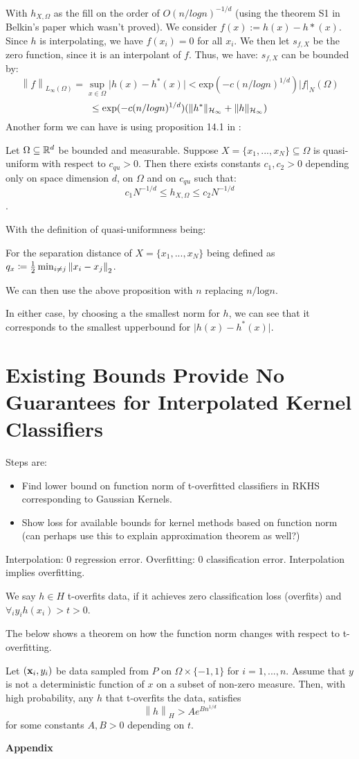\documentclass[english]{article}
\newcommand\norm[1]{\left\lVert#1\right\rVert}
\begin{document}
With $h_{X,\Omega}$ as the fill on the order of $O(n/logn)^{-1/d}$ (using the theorem S1 in Belkin's paper which wasn't proved).
We consider $f(x) := h(x) - h*(x)$. Since $h$ is interpolating, we have $f(x_i) = 0$ for all $x_i$. We then let $s_{f,X}$ be the zero function, since it is an interpolant of $f$. Thus, we have:
$s_{f,X}$ can be bounded by:
\[
\norm{f}_{L_\infty(\Omega)} = \sup_{x \in \Omega} \vert h(x) - h^*(x)\vert <
\text{exp}(-c(n/log n)^{1/d})|f|_N(\Omega)
\]
\[
\leq \text{exp}(-c(n/log n)^{1/d}) (\| h^* \|_{\mathcal{H}_\infty} + \| h \|_{\mathcal{H}_\infty})
\]
Another form we can have is using proposition 14.1 in \cite{ScatteredDataApproximation}:
\begin{prop}
	Let $\Omega \subseteq \mathbb{R}^d$ be bounded and measurable. Suppose $X = \{x_1, ... , x_N\} \subseteq \Omega$ is quasi-uniform with respect to  $c_{qu} > 0$. Then there exists constants $c_1, c_2 > 0$ depending only on space dimension $d$, on $\Omega$ and on $c_{qu}$ such that:
	\[c_1N^{-1/d} \leq h_{X,\Omega} \leq c_2N^{-1/d} \].
\end{prop}
With the definition of quasi-uniformness being:
\begin{defn}
	For the separation distance of $X = \{x_1, ... , x_N\}$ being defined as $q_x \coloneqq \half \min_{i\neq j} \norm{x_i - x_j}_2$.
\end{defn}
We can then use the above proposition with $n$ replacing $n/\text{log}n$.

In either case, by choosing a the smallest norm for $h$, we can see that it corresponds to the smallest upperbound for $\vert h(x) - h^*(x)\vert$.

\section{Existing Bounds Provide No Guarantees for Interpolated Kernel Classifiers} \label{sec:BoundsKernel}
Steps are: 
\begin{itemize}
	\item Find lower bound on function norm of t-overfitted classifiers in RKHS corresponding to Gaussian Kernels.
	\item Show loss for available bounds for kernel methods based on function norm (can perhaps use this to explain approximation theorem as well?)
\end{itemize}
Interpolation: 0 regression error. Overfitting: 0 classification error. Interpolation implies overfitting.
\begin{defn}
	We say $h \in H$ t-overfits data, if it achieves zero classification loss (overfits) and $\forall_iy_ih(x_i) > t > 0$.
\end{defn}
The below shows a theorem on how the function norm changes with respect to t-overfitting.
\begin{thm}
	Let $(\mathbf{x}_i ,y_i)$ be data sampled from $P$ on $\Omega \times \{-1, 1\}$ for $i = 1,..., n$. Assume that $y$ is not a deterministic function of $x$ on a subset of non-zero measure. Then, with high probability, any $h$ that t-overfits the data, satisfies
	\[\norm{h}_H > Ae^{Bn^{1/d}}\]
	for some constants $A, B > 0$ depending on $t$.
\end{thm}


\newpage



\newpage
{\huge \centering \bf Appendix \par}

\appendix
\end{document}
